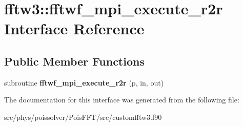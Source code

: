 \hypertarget{interfacefftw3_1_1fftwf__mpi__execute__r2r}{}\section{fftw3\+:\+:fftwf\+\_\+mpi\+\_\+execute\+\_\+r2r Interface Reference}
\label{interfacefftw3_1_1fftwf__mpi__execute__r2r}
\subsection*{Public Member Functions}
\begin{DoxyCompactItemize}
\item 
subroutine {\bfseries fftwf\+\_\+mpi\+\_\+execute\+\_\+r2r} (p, in, out)\hypertarget{interfacefftw3_1_1fftwf__mpi__execute__r2r_afae4c3db2947ed1e1fde5dfec1f9275a}{}\label{interfacefftw3_1_1fftwf__mpi__execute__r2r_afae4c3db2947ed1e1fde5dfec1f9275a}

\end{DoxyCompactItemize}


The documentation for this interface was generated from the following file\+:\begin{DoxyCompactItemize}
\item 
src/phys/poissolver/\+Pois\+F\+F\+T/src/customfftw3.\+f90\end{DoxyCompactItemize}
